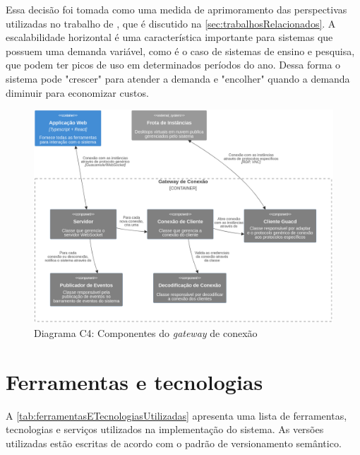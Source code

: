 Essa decisão foi tomada como uma medida de aprimoramento das perspectivas utilizadas no trabalho de \citet{edufirestick}, que é discutido na \autoref{sec:trabalhosRelacionados}. A escalabilidade horizontal é uma característica importante para sistemas que possuem uma demanda variável, como é o caso de sistemas de ensino e pesquisa, que podem ter picos de uso em determinados períodos do ano. Dessa forma o sistema pode "crescer" para atender a demanda e "encolher" quando a demanda diminuir para economizar custos.

\begin{figure}[H]
\caption{Diagrama C4: Componentes do \textit{gateway} de conexão}
\label{fig:diagramaC4ComponentesDoGateway}
\includegraphics[width=\textwidth]{capitulos/2-metodologia/files/c4-component-connection-gateway.png}
\end{figure}

\section{Ferramentas e tecnologias}
\label{sec:ferramentasETecnologias}

A \autoref{tab:ferramentasETecnologiasUtilizadas} apresenta uma lista de ferramentas, tecnologias e serviços utilizados na implementação do sistema. As versões utilizadas estão escritas de acordo com o padrão de versionamento semântico. \citep{semverdocs}

